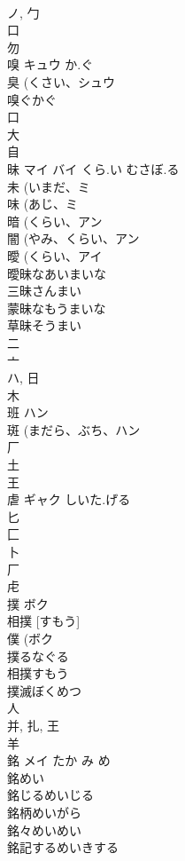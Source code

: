 \documentclass[8pt]{extreport}
\begin{document}
\begin{CJK}{UTF8}{min}
\\	ノ, 勹 
\\	口 
\\	勿 
\\	嗅	キュウ	か.ぐ	
\\	臭 (くさい、シュウ 
\\	嗅ぐかぐ 
\\	口 
\\	大 
\\	自 
\\	昧	マイ バイ	くら.い むさぼ.る	
\\	未 (いまだ、ミ 
\\	味 (あじ、ミ 
\\	暗 (くらい、アン 
\\	闇 (やみ、くらい、アン 
\\	曖 (くらい、アイ 
\\	曖昧なあいまいな
\\	三昧さんまい
\\	蒙昧なもうまいな
\\	草昧そうまい
\\	二 
\\	亠 
\\	ハ, 日 
\\	木 
\\	班	ハン		
\\	斑 (まだら、ぶち、ハン 
\\	厂 
\\	土 
\\	王 
\\	虐	ギャク	しいた.げる	
\\	匕 
\\	匚 
\\	卜 
\\	厂 
\\	虍 
\\	撲	ボク		
\\	相撲 [すもう] 
\\	僕 (ボク 
\\	撲るなぐる
\\	相撲すもう
\\	撲滅ぼくめつ
\\	人 
\\	并, 扎, 王 
\\	羊 
\\	銘	メイ	たか み め	
\\	銘めい
\\	銘じるめいじる
\\	銘柄めいがら
\\	銘々めいめい
\\	銘記するめいきする

\end{CJK}
\end{document}
